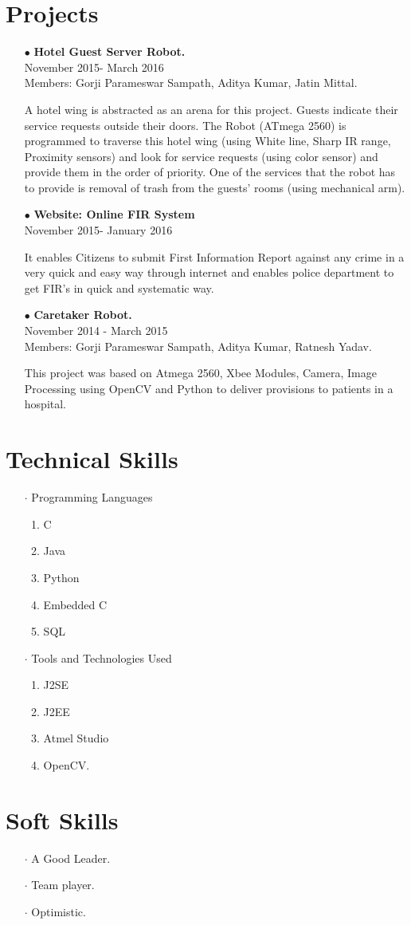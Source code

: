 \documentclass[12pt]{article}
\begin{document}
\section*{Projects}
\begin{itemize}
\item[$\bullet$]\textbf{Hotel Guest Server Robot.}\\November 2015- March 2016\\Members: Gorji Parameswar Sampath, Aditya Kumar, Jatin Mittal.

A hotel wing is abstracted as an arena for this project. Guests indicate their service requests outside their doors. The Robot (ATmega 2560) is programmed to traverse this hotel wing (using White line, Sharp IR range, Proximity sensors) and look for service requests (using color sensor) and provide them in the order of priority. One of the services that the robot has to provide is removal of trash from the guests’ rooms (using mechanical arm).
\item[$\bullet$]\textbf{Website: Online FIR System}\\November 2015- January 2016

It enables Citizens to submit First Information Report against any crime in a very quick and easy way through internet and enables police department to get FIR’s in quick and systematic way.
\item[$\bullet$]\textbf{Caretaker Robot.}\\November 2014 - March 2015 \\Members: Gorji Parameswar Sampath, Aditya Kumar, Ratnesh Yadav.

This project was based on Atmega 2560, Xbee Modules, Camera, Image Processing using OpenCV and Python to deliver provisions to patients in a hospital.
\end{itemize}
\section*{Technical Skills}
\begin{itemize}
\item[$\cdot$]Programming Languages
\begin{enumerate}
\item C
\item Java
\item Python
\item Embedded C
\item SQL
\end{enumerate}
\item[$\cdot$]Tools and Technologies Used
\begin{enumerate}
\item J2SE
\item J2EE
\item Atmel Studio
\item OpenCV.
\end{enumerate}
\end{itemize}
\section*{Soft Skills}
\begin{itemize}
\item[$\cdot$] A Good Leader.
\item[$\cdot$] Team player.
\item[$\cdot$] Optimistic. 
\end{itemize}
\end{document}
